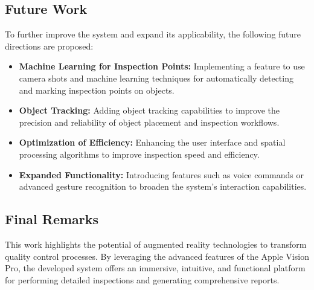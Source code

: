 \subsection{Future Work}
To further improve the system and expand its applicability, the following future directions are proposed:
\begin{itemize}
    \item \textbf{Machine Learning for Inspection Points:} Implementing a feature to use camera shots and machine learning techniques for automatically detecting and marking inspection points on objects.
    \item \textbf{Object Tracking:} Adding object tracking capabilities to improve the precision and reliability of object placement and inspection workflows.
    \item \textbf{Optimization of Efficiency:} Enhancing the user interface and spatial processing algorithms to improve inspection speed and efficiency.
    \item \textbf{Expanded Functionality:} Introducing features such as voice commands or advanced gesture recognition to broaden the system’s interaction capabilities.
\end{itemize}


\subsection{Final Remarks}
This work highlights the potential of augmented reality technologies to transform quality control processes. By leveraging the advanced features of the Apple Vision Pro, the developed system offers an immersive, intuitive, and functional platform for performing detailed inspections and generating comprehensive reports.
